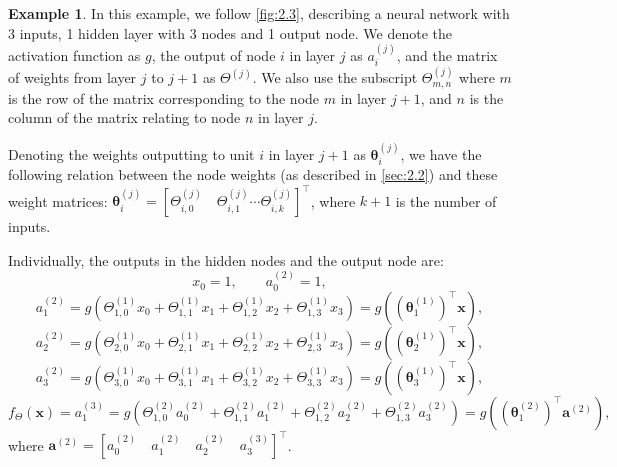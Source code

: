 \documentclass[honours,12pt, twoside]{unswthesis}
\numberwithin{equation}{section}
\theoremstyle{definition}
\newtheorem{example}[theorem]{Example}
\begin{document}
\begin{example}
In this example, we follow \autoref{fig:2.3}, describing a neural network with 3 inputs, 1 hidden layer with 3 nodes and 1 output node. We denote the activation function as $g$, the output of node $i$ in layer $j$ as $a^{(j)}_i$, and the matrix of weights from layer $j$ to $j+1$ as $\Theta^{(j)}$. We also use the subscript $\Theta^{(j)}_{m,n}$ where $m$ is the row of the matrix corresponding to the node $m$ in layer $j+1$, and $n$ is the column of the matrix relating to node $n$ in layer $j$.

Denoting the weights outputting to unit $i$ in layer $j+1$ as $\bm{\theta}^{(j)}_i$, we have the following relation between the node weights (as described in \autoref{sec:2.2}) and these weight matrices: $\bm{\theta}^{(j)}_i = \left[\Theta_{i,0}^{(j)}\quad \Theta_{i,1}^{(j)}\cdots \Theta_{i,k}^{(j)}\right]^\top$, where $k+1$ is the number of inputs.

Individually, the outputs in the hidden nodes and the output node are:
\[x_0=1,\qquad a_0^{(2)}=1,\]
\[a_1^{(2)}=g\left(\Theta^{(1)}_{1,0}x_0+\Theta^{(1)}_{1,1}x_1+\Theta^{(1)}_{1,2}x_2+\Theta^{(1)}_{1,3}x_3\right)=g\left((\bm{\theta}^{(1)}_1)^\top\bm{x}\right),\]
\[a_2^{(2)}=g\left(\Theta^{(1)}_{2,0}x_0+\Theta^{(1)}_{2,1}x_1+\Theta^{(1)}_{2,2}x_2+\Theta^{(1)}_{2,3}x_3\right)=g\left((\bm{\theta}^{(1)}_2)^\top\bm{x}\right),\]
\[a_3^{(2)}=g\left(\Theta^{(1)}_{3,0}x_0+\Theta^{(1)}_{3,1}x_1+\Theta^{(1)}_{3,2}x_2+\Theta^{(1)}_{3,3}x_3\right)=g\left((\bm{\theta}^{(1)}_3)^\top\bm{x}\right),\]
\[f_\Theta(\bm{x})=a_1^{(3)}=g\left(\Theta^{(2)}_{1,0}a_0^{(2)}+\Theta^{(2)}_{1,1}a_1^{(2)}+\Theta^{(2)}_{1,2}a_2^{(2)}+\Theta^{(2)}_{1,3}a_3^{(2)}\right)=g\left((\bm{\theta}^{(2)}_1)^\top\bm{a}^{(2)}\right),\]
where $\bm{a}^{(2)}=\left[a_0^{(2)}\quad a_1^{(2)}\quad a_2^{(2)}\quad a_3^{(3)}\right]^\top$.
\end{example}
\end{document}

